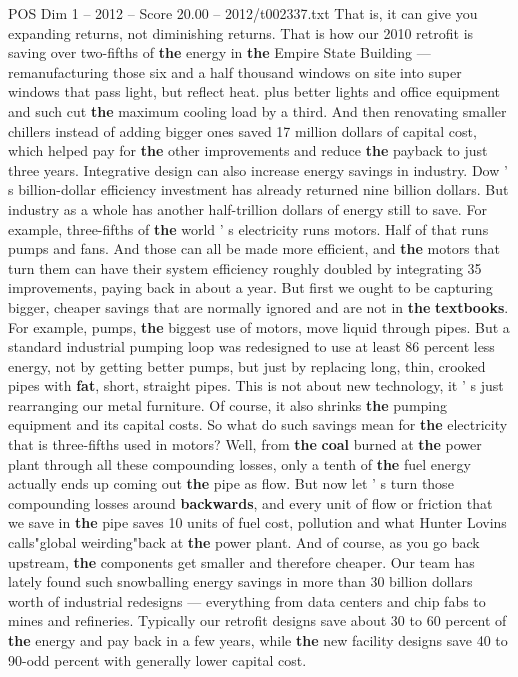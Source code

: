 \begin{textsample}{POS Dim 1 – 2012 – Score 20.00 – 2012/t002337.txt}
That is, it can give you expanding returns, not diminishing returns.
That is how our 2010 retrofit is saving over two-fifths of \textbf{the} energy in \textbf{the} Empire State Building — remanufacturing those six and a half thousand windows on site into super windows that pass light, but reflect heat. plus better lights and office equipment and such cut \textbf{the} maximum cooling load by a third.
And then renovating smaller chillers instead of adding bigger ones saved 17 million dollars of capital cost, which helped pay for \textbf{the} other improvements and reduce \textbf{the} payback to just three years.
Integrative design can also increase energy savings in industry.
Dow ' s billion-dollar efficiency investment has already returned nine billion dollars.
But industry as a whole has another half-trillion dollars of energy still to save.
For example, three-fifths of \textbf{the} world ' s electricity runs motors.
Half of that runs pumps and fans.
And those can all be made more efficient, and \textbf{the} motors that turn them can have their system efficiency roughly doubled by integrating 35 improvements, paying back in about a year.
But first we ought to be capturing bigger, cheaper savings that are normally ignored and are not in \textbf{the} \textbf{textbooks}.
For example, pumps, \textbf{the} biggest use of motors, move liquid through pipes.
But a standard industrial pumping loop was redesigned to use at least 86 percent less energy, not by getting better pumps, but just by replacing long, thin, crooked pipes with \textbf{fat}, short, straight pipes.
This is not about new technology, it ' s just rearranging our metal furniture.
Of course, it also shrinks \textbf{the} pumping equipment and its capital costs.
So what do such savings mean for \textbf{the} electricity that is three-fifths used in motors?
Well, from \textbf{the} \textbf{coal} burned at \textbf{the} power plant through all these compounding losses, only a tenth of \textbf{the} fuel energy actually ends up coming out \textbf{the} pipe as flow.
But now let ' s turn those compounding losses around \textbf{backwards}, and every unit of flow or friction that we save in \textbf{the} pipe saves 10 units of fuel cost, pollution and what Hunter Lovins calls"global weirding"back at \textbf{the} power plant.
And of course, as you go back upstream, \textbf{the} components get smaller and therefore cheaper.
Our team has lately found such snowballing energy savings in more than 30 billion dollars worth of industrial redesigns — everything from data centers and chip fabs to mines and refineries.
Typically our retrofit designs save about 30 to 60 percent of \textbf{the} energy and pay back in a few years, while \textbf{the} new facility designs save 40 to 90-odd percent with generally lower capital cost.

\end{textsample}
